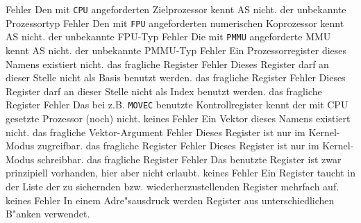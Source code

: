 \documentclass[12pt,a4paper,twoside]{report}
\newcommand{\tty}[1]{{\tt #1}}
\newcommand{\asname}{AS}
\begin{document}
\begin{description}
               {Fehler}
               {Den mit \tty{CPU} angeforderten Zielprozessor kennt \asname{}
                nicht.}
               {der unbekannte Prozessortyp}
               {Fehler}
               {Den mit \tty{FPU} angeforderten numerischen Koprozessor kennt \asname{}
                nicht.}
               {der unbekannte FPU-Typ}
               {Fehler}
               {Die mit \tty{PMMU} angeforderte MMU kennt \asname{} nicht.}
               {der unbekannte PMMU-Typ}
               {Fehler}
               {Ein Prozessorregister dieses Namens existiert nicht.}
               {das fragliche Register}
               {Fehler}
               {Dieses Register darf an dieser Stelle nicht als Basis benutzt
	        werden.}
               {das fragliche Register}
               {Fehler}
               {Dieses Register darf an dieser Stelle nicht als Index benutzt
	        werden.}
               {das fragliche Register}
               {Fehler}
               {Das bei z.B. \tty{MOVEC} benutzte
	        Kontrollregister  kennt der mit CPU gesetzte Prozessor
	        (noch) nicht.}
               {keines}
               {Fehler}
               {Ein Vektor dieses Namens existiert nicht.}
               {das fragliche Vektor-Argument}
               {Fehler}
               {Dieses Register ist nur im Kernel-Modus zugreifbar.}
               {das fragliche Register}
               {Fehler}
               {Dieses Register ist nur im Kernel-Modus schreibbar.}
               {das fragliche Register}
               {Fehler}
               {Das benutzte Register ist zwar prinzipiell
                vorhanden, hier aber nicht erlaubt.}
               {keines}
               {Fehler}
               {Ein Register taucht in der Liste der zu sichernden bzw.
                wiederherzustellenden Register mehrfach auf.}
               {keines}
               {Fehler}
               {In einem Adre"sausdruck werden Register aus unterschiedlichen
                B"anken verwendet.}

\end{description}
\end{document}
